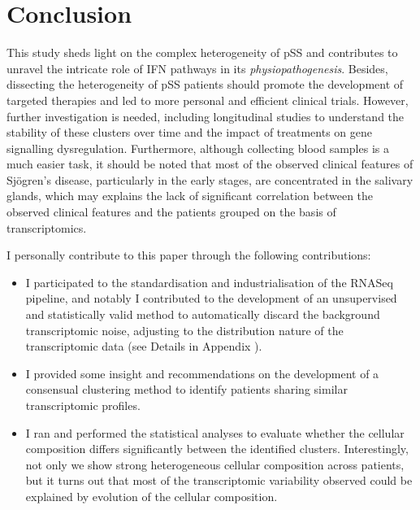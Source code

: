 \documentclass[mainlanguage=english,numlaboratories=2, nofrontcover=true,noaim=false, localbibs, colophon-location=verso-frontcover, oneside, 10pt, localtocs, version=final, nomakeabstract=true]{yathesis}
\begin{document}
% 

\section{Conclusion}

This study sheds light on the complex heterogeneity of pSS and contributes to unravel the intricate role of IFN pathways in its \emph{physiopathogenesis}. Besides, dissecting the heterogeneity of pSS patients should promote the development of targeted therapies and led to more personal and efficient clinical trials. However, further investigation is needed, including longitudinal studies to understand the stability of these clusters over time and the impact of treatments on gene signalling dysregulation. Furthermore, although collecting blood samples is a much easier task, it should be noted that most of the observed clinical features of Sjögren's disease, particularly in the early stages, are concentrated in the salivary glands, which may explains the lack of significant correlation between the observed clinical features and the patients grouped on the basis of transcriptomics.


I personally contribute to this paper through the following contributions:
\begin{itemize}
\item I participated to the standardisation and industrialisation of the RNASeq pipeline, and notably I contributed to the development of an unsupervised and statistically valid method to automatically discard the background transcriptomic noise, adjusting to the distribution nature of the transcriptomic data (see Details in Appendix ).

\item I provided some insight and recommendations on the development of a consensual clustering method to identify patients sharing similar transcriptomic profiles. 

\item I ran and performed the statistical analyses to evaluate whether the cellular composition differs significantly between the identified clusters. Interestingly, not only we show strong heterogeneous cellular composition across patients, but it turns out that most of the transcriptomic variability observed could be explained by evolution of the cellular composition. 
\end{itemize}
\end{document}
